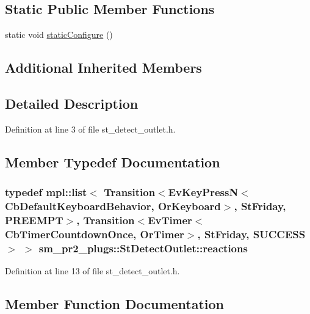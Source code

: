 \subsection*{Static Public Member Functions}
\begin{DoxyCompactItemize}
\item 
static void \hyperlink{structsm__pr2__plugs_1_1StDetectOutlet_afec8c7c7af071a426208a1a23f26a2bb}{static\+Configure} ()
\end{DoxyCompactItemize}
\subsection*{Additional Inherited Members}


\subsection{Detailed Description}


Definition at line 3 of file st\+\_\+detect\+\_\+outlet.\+h.



\subsection{Member Typedef Documentation}
\subsubsection[{\texorpdfstring{reactions}{reactions}}]{\setlength{\rightskip}{0pt plus 5cm}typedef mpl\+::list$<$ Transition$<$Ev\+Key\+PressN$<$Cb\+Default\+Keyboard\+Behavior, {\bf Or\+Keyboard}$>$, {\bf St\+Friday}, {\bf P\+R\+E\+E\+M\+PT}$>$, Transition$<$Ev\+Timer$<$Cb\+Timer\+Countdown\+Once, {\bf Or\+Timer}$>$, {\bf St\+Friday}, {\bf S\+U\+C\+C\+E\+SS}$>$ $>$ {\bf sm\+\_\+pr2\+\_\+plugs\+::\+St\+Detect\+Outlet\+::reactions}}\hypertarget{structsm__pr2__plugs_1_1StDetectOutlet_ada5b434f5d792f4b09c90b7b56cfaa03}{}\label{structsm__pr2__plugs_1_1StDetectOutlet_ada5b434f5d792f4b09c90b7b56cfaa03}


Definition at line 13 of file st\+\_\+detect\+\_\+outlet.\+h.



\subsection{Member Function Documentation}
